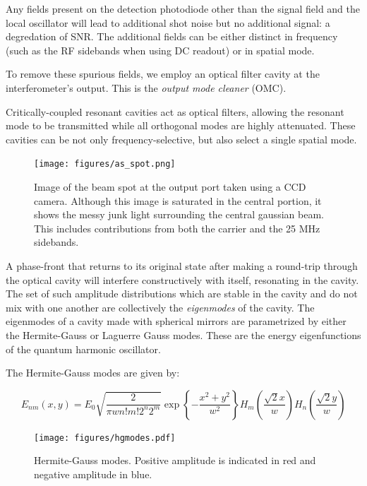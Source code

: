 \label{chapter4}
{}
Any fields present on the detection photodiode other than the signal
field and the local oscillator will lead to additional shot noise but
no additional signal: a degredation of SNR.  The additional fields can
be either distinct in frequency (such as the RF sidebands when using
DC readout) or in spatial mode. 

To remove these spurious fields, we employ an optical filter cavity at
the interferometer's output. This is the \emph{output mode cleaner}
(OMC).


Critically-coupled resonant cavities act as optical filters, allowing
the resonant mode to be transmitted while all orthogonal modes are
highly attenuated.  These cavities can be not only
frequency-selective, but also select a single spatial mode.

\begin{figure}[t]
\centerline{\texttt{[image: figures/as\_spot.png]}}
\caption{\label{fig:as-spot}Image of the beam spot at the output port taken using a CCD
  camera. Although this image is saturated in the central portion, it
  shows the messy junk light surrounding the central gaussian beam.
  This includes contributions from both the carrier and the 25 MHz
  sidebands.}
\end{figure}


A phase-front that returns to its original state after making a
round-trip through the optical cavity will interfere constructively
with itself, resonating in the cavity.  The set of such amplitude
distributions which are stable in the cavity and do not mix with one
another are collectively the \emph{eigenmodes} of the cavity.  The
eigenmodes of a cavity made with spherical mirrors are parametrized by
either the Hermite-Gauss or Laguerre Gauss modes.  These are the
energy eigenfunctions of the quantum harmonic oscillator.

The Hermite-Gauss modes are given by:

\begin{equation}
E_{nm}(x,y) = E_0 
\sqrt{ 
  \frac{2}{\pi w n! m! 2^n 2^m}
}
\exp \left\{-\frac{x^2+y^2}{w^2}\right\}
H_m\left( \frac{\sqrt{2}x}{w} \right)
H_n\left( \frac{\sqrt{2}y}{w} \right)
\end{equation}

\begin{figure}
\texttt{[image: figures/hgmodes.pdf]}
\caption{Hermite-Gauss modes. Positive amplitude is indicated in red and negative amplitude in blue.}
\end{figure}

